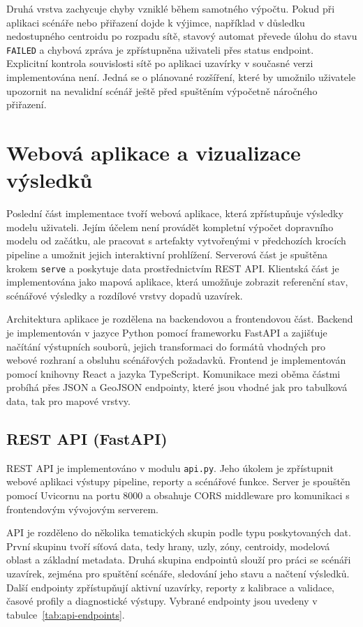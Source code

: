 Druhá vrstva zachycuje chyby vzniklé během samotného výpočtu. Pokud při aplikaci scénáře nebo přiřazení dojde k výjimce, například v důsledku nedostupného centroidu po rozpadu sítě, stavový automat převede úlohu do stavu \texttt{FAILED} a chybová zpráva je zpřístupněna uživateli přes status endpoint. Explicitní kontrola souvislosti sítě po aplikaci uzavírky v současné verzi implementována není. Jedná se o plánované rozšíření, které by umožnilo uživatele upozornit na nevalidní scénář ještě před spuštěním výpočetně náročného přiřazení.

\section{Webová aplikace a vizualizace výsledků}
\label{sec:impl-frontend}

Poslední část implementace tvoří webová aplikace, která zpřístupňuje výsledky modelu uživateli. Jejím účelem není provádět kompletní výpočet dopravního modelu od začátku, ale pracovat s artefakty vytvořenými v předchozích krocích pipeline a umožnit jejich interaktivní prohlížení. Serverová část je spuštěna krokem \texttt{serve} a poskytuje data prostřednictvím REST API. Klientská část je implementována jako mapová aplikace, která umožňuje zobrazit referenční stav, scénářové výsledky a rozdílové vrstvy dopadů uzavírek.

Architektura aplikace je rozdělena na backendovou a frontendovou část. Backend je implementován v jazyce Python pomocí frameworku FastAPI a zajišťuje načítání výstupních souborů, jejich transformaci do formátů vhodných pro webové rozhraní a obsluhu scénářových požadavků. Frontend je implementován pomocí knihovny React a jazyka TypeScript. Komunikace mezi oběma částmi probíhá přes JSON a GeoJSON endpointy, které jsou vhodné jak pro tabulková data, tak pro mapové vrstvy.

\subsection{REST API (FastAPI)}
\label{sec:impl-frontend-api}

REST API je implementováno v modulu \texttt{api.py}. Jeho úkolem je zpřístupnit webové aplikaci výstupy pipeline, reporty a scénářové funkce. Server je spouštěn pomocí Uvicornu na portu 8000 a obsahuje CORS middleware pro komunikaci s frontendovým vývojovým serverem.

API je rozděleno do několika tematických skupin podle typu poskytovaných dat. První skupinu tvoří síťová data, tedy hrany, uzly, zóny, centroidy, modelová oblast a základní metadata. Druhá skupina endpointů slouží pro práci se scénáři uzavírek, zejména pro spuštění scénáře, sledování jeho stavu a načtení výsledků. Další endpointy zpřístupňují aktivní uzavírky, reporty z kalibrace a validace, časové profily a diagnostické výstupy. Vybrané endpointy jsou uvedeny v tabulce~\ref{tab:api-endpoints}.

